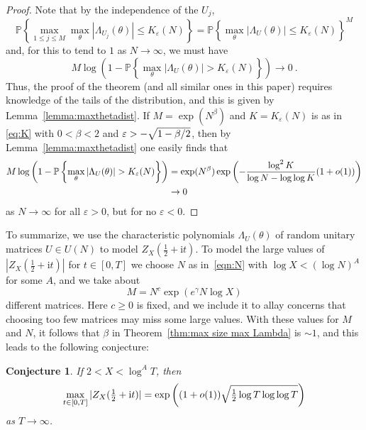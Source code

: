 \documentclass[10pt,reqno,twoside]{amsart}
\renewcommand{\i}{{\mathrm{i}}} %
\newcommand{\Prob}{\mathbb{P}}
\newtheorem{conj}{Conjecture}
\numberwithin{equation}{section}
\numberwithin{theorem}{section}
\begin{document}
{{\begin{proof}
Note that by the independence of the $U_j$,
\begin{equation}
\Prob\left\{ \max_{1\leq j \leq M} \max_{\theta}
|\Lambda_{U_j}(\theta)| \leq K_\varepsilon(N) \right\}
=\Prob\left\{ \max_{\theta} |\Lambda_{U}(\theta)| \leq
K_\varepsilon(N) \right\}^M
\end{equation}
and, for this to tend to $1$ as $N\to\infty$, we must have
\begin{equation}
M \log \left(1-\Prob\left\{ \max_{\theta} |\Lambda_{U}(\theta)|
> K_\varepsilon(N) \right\} \right) \to 0 \ .
\end{equation}
Thus, the proof of the theorem (and all  similar ones in
this paper) requires knowledge of the tails of the distribution,
and this is given by Lemma~\ref{lemma:maxthetadist}.
If $M=\exp(N^\beta)$ and $K=K_\varepsilon(N)$ is as in \eqref{eq:K}
with $0<\beta<2$ and $\varepsilon>-\sqrt{\mathstrut 1-\beta/2}$, then by
Lemma~\ref{lemma:maxthetadist} one  easily finds that
\begin{align}
M \log \left(1-\Prob\left\{ \max_{\theta} |\Lambda_{U}(\theta)|
> K_\varepsilon(N) \right\} \right) &= \exp(N^\beta) \exp\left(-\frac{\log^2 K}{ \log N - \log \log K}
(1+o(1))\right) \\
&\to 0 \notag
\end{align}
as $N\to\infty$ for all $\varepsilon>0$, but for no
$\varepsilon<0$.
\end{proof}


To summarize, we use the characteristic polynomials
$\Lambda_{U}(\theta)$ of random unitary matrices $U\in U(N)$ to
model $Z_X(\frac12+\i t)$. To model the large values of
$|Z_X(\frac12+\i t)|$ for $t\in [0,T]$ we choose $N$ as
in~\eqref{eqn:N} with $\log X < (\log N)^A$ for some $A$, and
we take about
\begin{equation}\label{eqn:Nc}
M= N^c \exp\left(e^\gamma {N \log X}\right)
\end{equation}
different matrices. Here $c\ge 0$ is fixed, and we include it to
allay concerns that choosing too few matrices  may miss some large
values. With these values for $M$ and  $N$,  it follows that  $\beta$
 in  Theorem~\ref{thm:max size max Lambda} is  $\sim 1$, and this leads to the following
conjecture:
\begin{conj}\label{conj:max value ZX}
If $2<X<\log^A T$, then
\begin{equation}
\max_{t\in[0,T]} |Z_X(\tfrac12+\i t)|  = \exp\left( (1+o(1))
\sqrt{\mathstrut \tfrac12 \log T\log \log T}\right)
\end{equation}
as $T\to\infty$.
\end{conj}

}}
\end{document}
